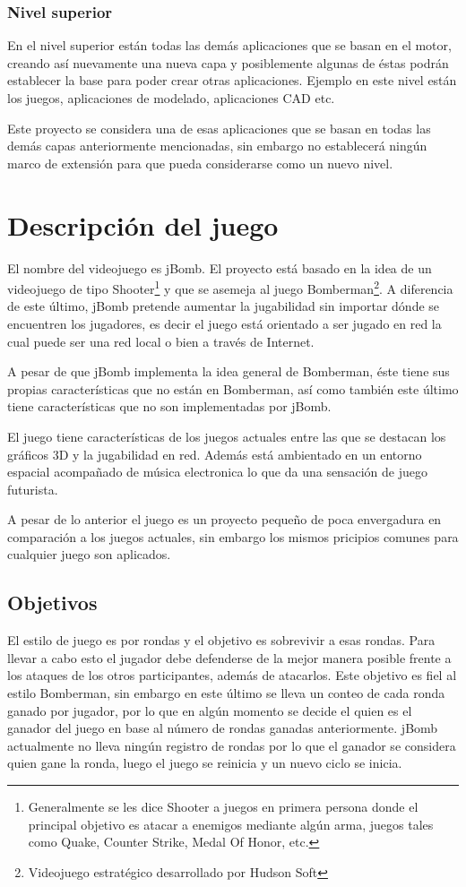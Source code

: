 \documentclass[a4paper,12pt,openany,oneside]{book}
\begin{document}
\subsection{Nivel superior}
En el nivel superior están todas las demás aplicaciones que se basan en el motor, creando así nuevamente una nueva capa y posiblemente algunas de éstas podrán establecer la base para poder crear otras aplicaciones. Ejemplo en este nivel están los juegos, aplicaciones de modelado, aplicaciones CAD etc.

Este proyecto se considera una de esas aplicaciones que se basan en todas las demás capas anteriormente mencionadas, sin embargo no establecerá ningún marco de extensión para que pueda considerarse como un nuevo nivel. 
\chapter{Descripción del juego}
El nombre del videojuego es jBomb. El proyecto está basado en la idea de un videojuego de tipo Shooter\footnote{Generalmente se les dice Shooter a juegos en primera persona donde el principal objetivo es atacar a enemigos mediante algún arma, juegos tales como Quake, Counter Strike, Medal Of Honor, etc.} y que se asemeja al juego Bomberman\footnote{Videojuego estratégico desarrollado por Hudson Soft}. A diferencia de este último, jBomb pretende aumentar la jugabilidad sin importar dónde se encuentren los jugadores, es decir el juego está orientado a ser jugado en red la cual puede ser una red local o bien a través de Internet.

A pesar de que jBomb implementa la idea general de Bomberman, éste tiene sus propias características que no están en Bomberman, así como también este último tiene características que no son implementadas por jBomb. 

El juego tiene características de los juegos actuales entre las que se destacan los gráficos 3D y la jugabilidad en red. Además está ambientado en un entorno espacial acompañado de música electronica lo que da una sensación de juego futurista.

A pesar de lo anterior el juego es un proyecto pequeño de poca envergadura en comparación a los juegos actuales, sin embargo los mismos pricipios comunes para cualquier juego son aplicados.
\section{Objetivos}	
El estilo de juego es por rondas y el objetivo es sobrevivir a esas rondas. Para llevar a cabo esto el jugador debe defenderse de la mejor manera posible frente a los ataques de los otros participantes, además de atacarlos. Este objetivo es fiel al estilo Bomberman, sin embargo en este último se lleva un conteo de cada ronda ganado por jugador, por lo que en algún momento se decide el quien es el ganador del juego en base al número de rondas ganadas anteriormente.
jBomb actualmente no lleva ningún registro de rondas por lo que el ganador se considera quien gane la ronda, luego el juego se reinicia y un nuevo ciclo se inicia.
\end{document}
